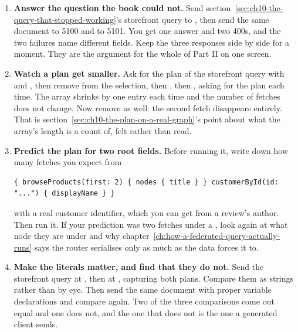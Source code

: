 \begin{enumerate}
  \item \textbf{Answer the question the book could not.} Send
  section~\ref{sec:ch10-the-query-that-stopped-working}'s storefront query to
  , then send the same document to 5100 and
  to 5101. You get one answer and two 400s, and the two failures name different
  fields. Keep the three responses side by side for a moment. They are the
  argument for the whole of Part II on one screen.

  \item \textbf{Watch a plan get smaller.} Ask for the plan of the storefront
  query with  and , then
  remove  from the selection, then , then
  , asking for the plan each time. The
   array shrinks by one entry each time and the number of
  fetches does not change. Now remove  as well: the second fetch
  disappears entirely. That is section~\ref{sec:ch10-the-plan-on-a-real-graph}'s
  point about what the array's length is a count of, felt rather than read.

  \item \textbf{Predict the plan for two root fields.} Before running it, write
  down how many fetches you expect from

  \begin{verbatim}
{ browseProducts(first: 2) { nodes { title } } customerById(id: "...") { displayName } }
  \end{verbatim}

  with a real customer identifier, which you can get from a review's author.
  Then run it. If your prediction was two fetches under a , look
  again at what node they are under and why
  chapter~\ref{ch:how-a-federated-query-actually-runs} says the router
  serialises only as much as the data forces it to.

  \item \textbf{Make the literals matter, and find that they do not.} Send the
  storefront query at , then at , capturing both
  plans. Compare them as strings rather than by eye. Then send the same
  document with proper variable declarations and compare again. Two of the
  three comparisons come out equal and one does not, and the one that does not
  is the one a generated client sends.


\end{enumerate}
